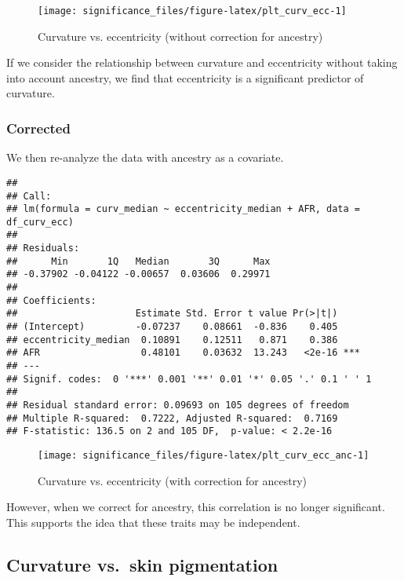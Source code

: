 \documentclass[
]{article}
\begin{document}
\begin{figure}
\texttt{[image: significance\_files/figure-latex/plt\_curv\_ecc-1]} \caption{Curvature vs. eccentricity (without correction for ancestry)}\label{fig:plt_curv_ecc}
\end{figure}

If we consider the relationship between curvature and eccentricity
without taking into account ancestry, we find that eccentricity is a
significant predictor of curvature.

\hypertarget{corrected}{%
\subsubsection{Corrected}\label{corrected}}

We then re-analyze the data with ancestry as a covariate.

\begin{verbatim}
## 
## Call:
## lm(formula = curv_median ~ eccentricity_median + AFR, data = df_curv_ecc)
## 
## Residuals:
##      Min       1Q   Median       3Q      Max 
## -0.37902 -0.04122 -0.00657  0.03606  0.29971 
## 
## Coefficients:
##                     Estimate Std. Error t value Pr(>|t|)    
## (Intercept)         -0.07237    0.08661  -0.836    0.405    
## eccentricity_median  0.10891    0.12511   0.871    0.386    
## AFR                  0.48101    0.03632  13.243   <2e-16 ***
## ---
## Signif. codes:  0 '***' 0.001 '**' 0.01 '*' 0.05 '.' 0.1 ' ' 1
## 
## Residual standard error: 0.09693 on 105 degrees of freedom
## Multiple R-squared:  0.7222, Adjusted R-squared:  0.7169 
## F-statistic: 136.5 on 2 and 105 DF,  p-value: < 2.2e-16
\end{verbatim}

\begin{figure}
\texttt{[image: significance\_files/figure-latex/plt\_curv\_ecc\_anc-1]} \caption{Curvature vs. eccentricity (with correction for ancestry)}\label{fig:plt_curv_ecc_anc}
\end{figure}

However, when we correct for ancestry, this correlation is no longer
significant. This supports the idea that these traits may be
independent.

\hypertarget{curvature-vs.-skin-pigmentation}{%
\subsection{Curvature vs.~skin
pigmentation}\label{curvature-vs.-skin-pigmentation}}
\end{document}
